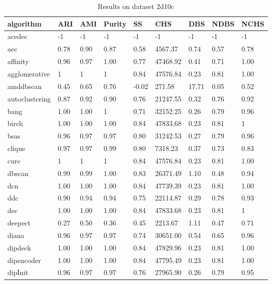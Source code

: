 \begin{table}[H]
\centering
\caption{Results on dataset 2d10c}
\label{S50_Table}
\begin{tabular}{|l|l|l|l|l|l|l|l|l|}
\hline
algorithm & ARI & AMI & Purity & SS & CHS & DBS & NDBS & NCHS \\
\hline
acedec & -1 & -1 & -1 & -1 & -1 & -1 & -1 & -1 \\
\hline
aec & 0.78 & 0.90 & 0.87 & 0.58 & 4567.37 & 0.74 & 0.57 & 0.78 \\
\hline
affinity & 0.96 & 0.97 & 1.00 & 0.77 & 47468.92 & 0.41 & 0.71 & 1.00 \\
\hline
agglomerative & 1 & 1 & 1 & 0.84 & 47576.84 & 0.23 & 0.81 & 1.00 \\
\hline
amddbscan & 0.45 & 0.65 & 0.76 & -0.02 & 271.58 & 17.71 & 0.05 & 0.52 \\
\hline
autoclustering & 0.87 & 0.92 & 0.90 & 0.76 & 21247.55 & 0.32 & 0.76 & 0.92 \\
\hline
bang & 1.00 & 1.00 & 1 & 0.71 & 32152.25 & 0.26 & 0.79 & 0.96 \\
\hline
birch & 1.00 & 1.00 & 1.00 & 0.84 & 47833.68 & 0.23 & 0.81 & 1 \\
\hline
bsas & 0.96 & 0.97 & 0.97 & 0.80 & 31242.53 & 0.27 & 0.79 & 0.96 \\
\hline
clique & 0.97 & 0.97 & 0.99 & 0.80 & 7318.23 & 0.37 & 0.73 & 0.83 \\
\hline
cure & 1 & 1 & 1 & 0.84 & 47576.84 & 0.23 & 0.81 & 1.00 \\
\hline
dbscan & 0.99 & 0.99 & 1.00 & 0.83 & 26371.49 & 1.10 & 0.48 & 0.94 \\
\hline
dcn & 1.00 & 1.00 & 1.00 & 0.84 & 47739.39 & 0.23 & 0.81 & 1.00 \\
\hline
ddc & 0.90 & 0.94 & 0.94 & 0.75 & 22114.87 & 0.29 & 0.78 & 0.93 \\
\hline
dec & 1.00 & 1.00 & 1.00 & 0.84 & 47833.68 & 0.23 & 0.81 & 1 \\
\hline
deepect & 0.27 & 0.50 & 0.36 & 0.45 & 2213.67 & 1.11 & 0.47 & 0.71 \\
\hline
diana & 0.96 & 0.97 & 0.97 & 0.74 & 30651.00 & 0.54 & 0.65 & 0.96 \\
\hline
dipdeck & 1.00 & 1.00 & 1.00 & 0.84 & 47829.96 & 0.23 & 0.81 & 1.00 \\
\hline
dipencoder & 1.00 & 1.00 & 1.00 & 0.84 & 47795.49 & 0.23 & 0.81 & 1.00 \\
\hline
dipInit & 0.96 & 0.97 & 0.97 & 0.76 & 27965.90 & 0.26 & 0.79 & 0.95 \\

\end{tabular}
\end{table}
